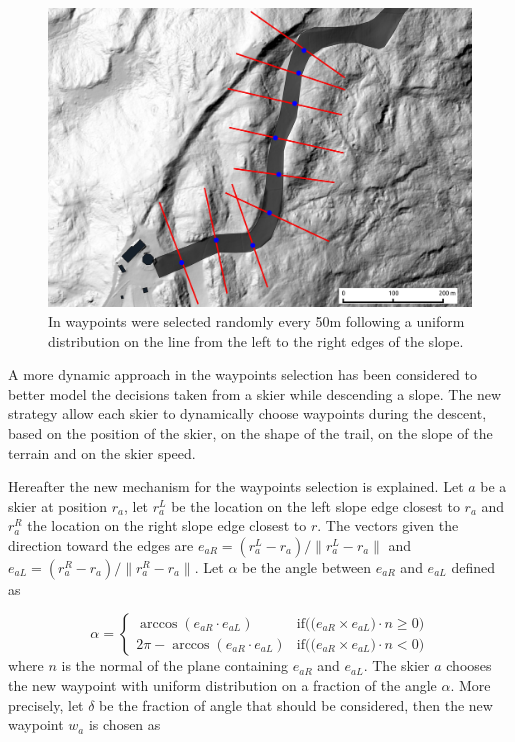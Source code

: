 \documentclass[12pt,a4paper,twoside]{book}
\newcommand{\norm}[1]{\lVert#1\rVert}
\begin{document}
\begin{figure}[!ht]
  \begin{center}
    \includegraphics[width=\textwidth]{images/waypoint_line.eps}
    \caption{In \cite{hol2012} waypoints were selected randomly every 50m following a uniform distribution on the line from the left to the right edges of the slope.}\label{waypoints_old_pic}
  \end{center}
\end{figure}

A more dynamic approach in the waypoints selection has been considered to better model the decisions taken from a skier while descending a slope. The new strategy allow each skier to dynamically choose waypoints during the descent, based on the position of the skier, on the shape of the trail, on the slope of the terrain and on the skier speed.

Hereafter the new mechanism for the waypoints selection is explained. Let $a$ be a skier at position $r_a$, let $r_a^L$ be the location on the left slope edge closest to $r_a$ and $r_a^R$ the location on the right slope edge closest to $r$. The vectors given the direction toward the edges are $e_{aR}=\left(r_a^L-r_a\right)/\norm{r_a^L-r_a}$ and $e_{aL}=\left(r_a^R-r_a\right)/\norm{r_a^R-r_a}$. Let $\alpha$ be the angle between $e_{aR}$ and $e_{aL}$ defined as

\begin{equation}
\alpha=\begin{cases}
  \arccos(e_{aR} \cdot e_{aL}) & \text{if(($e_{aR} \times e_{aL})\cdot n \ge 0$)} \\
  2\pi-\arccos(e_{aR} \cdot e_{aL}) & \text{if(($e_{aR} \times e_{aL})\cdot n < 0$)}
\end{cases}
\end{equation}
where $n$ is the normal of the plane containing $e_{aR}$ and $e_{aL}$. The skier $a$ chooses the new waypoint with uniform distribution on a fraction of the angle $\alpha$. More precisely, let $\delta$ be the fraction of angle that should be considered, then the new waypoint $w_a$ is chosen as
\end{document}

